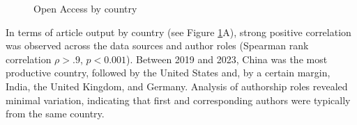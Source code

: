 \documentclass[a4paper,man,floatsintext,longtable,noextraspace,10pt]{apa6}
\begin{document}
\begin{figure}[ht!]


\caption{\label{fig-uptake_country}Open Access by country}

\end{figure}%

In terms of article output by country (see Figure
\ref{fig-uptake_country}A), strong positive correlation was observed
across the data sources and author roles (Spearman rank correlation
\(\rho > .9\), \(p < 0.001\)). Between 2019 and 2023, China was the most
productive country, followed by the United States and, by a certain
margin, India, the United Kingdom, and Germany. Analysis of authorship
roles revealed minimal variation, indicating that first and
corresponding authors were typically from the same country.
\end{document}
